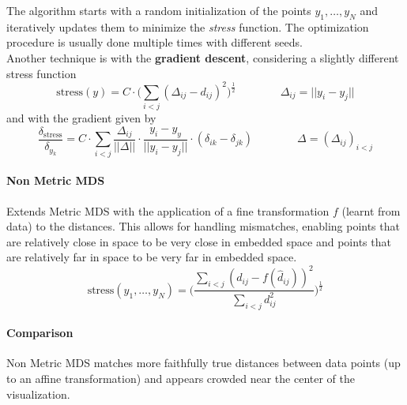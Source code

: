 The algorithm starts with a random initialization of the points $y_1, \ldots, y_N$ and iteratively updates them to minimize the \textit{stress} function. The optimization procedure is usually done multiple times with different seeds.\\
Another technique is with the \textbf{gradient descent}, considering a slightly different stress function
\begin{equation}
	\text{stress}(y) = C \cdot \big(\sum_{i<j} ( \Delta_{ij} - d_{ij})^2\big)^\frac{1}{2} \qquad\qquad \Delta_{ij} = \lvert\lvert y_i - y_j \rvert\rvert 
\end{equation}
and with the gradient given by
\begin{equation}
	\frac{\delta_{\text{stress}}}{\delta_{y_k}} = C \cdot \sum_{i<j} \frac{\Delta_{ij}}{\lvert\lvert \Delta \rvert\rvert} \cdot \frac{y_i - y_y}{\lvert\lvert y_i - y_j \rvert\rvert} \cdot (\delta_{ik} - \delta_{jk}) \qquad\qquad \Delta = (\Delta_{ij})_{i<j}
\end{equation}

\paragraph{Non Metric MDS}
Extends Metric MDS with the application of a fine transformation $f$ (learnt from data) to the distances. This allows for handling mismatches, enabling points that are relatively close in space to be very close in embedded space and points that are relatively far in space to be very far in embedded space.
\begin{equation}
	\text{stress}(y_1, \ldots, y_N) = \bigg(\frac{\sum_{i<j}(d_{ij} - f(\hat{d}_{ij}))^2}{\sum_{i<j}d^2_{ij}}\bigg)^\frac{1}{2}
\end{equation} 
\newpage
\paragraph{Comparison} Non Metric MDS matches more faithfully true distances between data points (up to an affine transformation) and appears crowded near the center of the visualization.
\begin{figure}[!h]
	\hfill
	\hfill
	\hfill
\end{figure}

